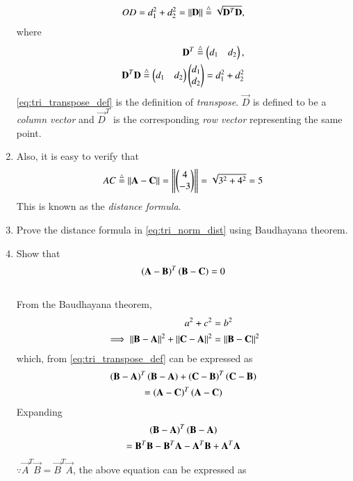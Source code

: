 \begin{enumerate}[label=\arabic*.,ref=\thesubsection.\theenumi]
%
\begin{align}
OD = d_1^2+d_2^2 = \left\lVert\mathbf{D}\right\rVert \stackrel{\triangle}{=} \sqrt{\mathbf{D}^T\mathbf{D}}, 
\label{eq:tri_norm_def}
\end{align}
%
where 
%
\begin{align}
\label{eq:tri_transpose_def}
 \mathbf{D}^T  \stackrel{\triangle}{=} \begin{pmatrix}d_1 & d_2\end{pmatrix},
\\
\mathbf{D}^T\mathbf{D} \stackrel{\triangle}{=} \begin{pmatrix}d_1 & d_2\end{pmatrix} \begin{pmatrix}d_1 \\ d_2\end{pmatrix} = d_1^2+d_2^2
\end{align}
%
\eqref{eq:tri_transpose_def} is the definition of {\em transpose}. $\vec{D}$ is defined to be a {\em column vector} and $\vec{D}^T$  is the corresponding {\em row vector} representing the same point.

\item Also, it is easy to verify that
%
\begin{align}
\label{eq:tri_norm_dist}
AC \stackrel{\triangle}{=}  \left\lVert\mathbf{A}-\mathbf{C}\right\rVert =  \left\lVert\begin{pmatrix}4\\-3\end{pmatrix}\right\rVert = \sqrt{3^2+4^2} = 5
\end{align}
%
This is known as the {\em distance formula}.
%
\item Prove the distance formula in \eqref{eq:tri_norm_dist} using Baudhayana theorem.
%
\item Show that 
\label{them:tri_baudh_orth}
\begin{align}
\label{eq:tri_baudh_orth}
\left(\mathbf{A}-\mathbf{B}\right)^T\left(\mathbf{B}-\mathbf{C}\right) = 0
\end{align}
\\
\solution From the Baudhayana theorem,
\begin{align}
a^2+c^2 &= b^2
\\
\implies \left\lVert\mathbf{B}-\mathbf{A}\right\rVert^2+\left\lVert\mathbf{C}-\mathbf{A}\right\rVert^2&=\left\lVert\mathbf{B}-\mathbf{C}\right\rVert^2
\label{eq:tri_baudh_orth_norm}
\end{align}
which, from \eqref{eq:tri_transpose_def}
 can be expressed as
\begin{multline}
\left(\mathbf{B}-\mathbf{A}\right)^T\left(\mathbf{B}-\mathbf{A}\right)
+
\left(\mathbf{C}-\mathbf{B}\right)^T\left(\mathbf{C}-\mathbf{B}\right)
\\
=
\left(\mathbf{A}-\mathbf{C}\right)^T\left(\mathbf{A}-\mathbf{C}\right)
\end{multline}
%
Expanding
\begin{multline}
\left(\mathbf{B}-\mathbf{A}\right)^T\left(\mathbf{B}-\mathbf{A}\right) 
\\
= \mathbf{B}^T\mathbf{B} - \mathbf{B}^T\mathbf{A} - \mathbf{A}^T\mathbf{B}+\mathbf{A}^T\mathbf{A}
\end{multline}
$\because \vec{A}^T\vec{B} = \vec{B}^T\vec{A}$, the above equation can be expressed as

\end{enumerate}
